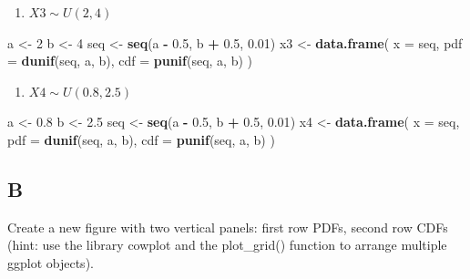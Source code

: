 \documentclass[
]{article}
\newenvironment{Shaded}{\begin{snugshade}}{\end{snugshade}}
\newcommand{\DataTypeTok}[1]{\textcolor[rgb]{0.13,0.29,0.53}{#1}}
\newcommand{\DecValTok}[1]{\textcolor[rgb]{0.00,0.00,0.81}{#1}}
\newcommand{\FloatTok}[1]{\textcolor[rgb]{0.00,0.00,0.81}{#1}}
\newcommand{\KeywordTok}[1]{\textcolor[rgb]{0.13,0.29,0.53}{\textbf{#1}}}
\newcommand{\NormalTok}[1]{#1}
\newcommand{\OperatorTok}[1]{\textcolor[rgb]{0.81,0.36,0.00}{\textbf{#1}}}
\newcommand{\StringTok}[1]{\textcolor[rgb]{0.31,0.60,0.02}{#1}}
\providecommand{\tightlist}{%
  \setlength{\itemsep}{0pt}\setlength{\parskip}{0pt}}
\begin{document}
\begin{enumerate}
\def\labelenumi{\arabic{enumi}.}
\setcounter{enumi}{2}
\tightlist
\item
  \(X3 \sim U(2,4)\)
\end{enumerate}

\begin{Shaded}
\begin{Highlighting}[]
\NormalTok{a \textless{}{-}}\StringTok{ }\DecValTok{2}
\NormalTok{b \textless{}{-}}\StringTok{ }\DecValTok{4}
\NormalTok{seq \textless{}{-}}\StringTok{ }\KeywordTok{seq}\NormalTok{(a }\OperatorTok{{-}}\StringTok{ }\FloatTok{0.5}\NormalTok{, b }\OperatorTok{+}\StringTok{ }\FloatTok{0.5}\NormalTok{, }\FloatTok{0.01}\NormalTok{)}
\NormalTok{x3 \textless{}{-}}\StringTok{ }\KeywordTok{data.frame}\NormalTok{(}
  \DataTypeTok{x =}\NormalTok{ seq,}
  \DataTypeTok{pdf =} \KeywordTok{dunif}\NormalTok{(seq, a, b),}
  \DataTypeTok{cdf =} \KeywordTok{punif}\NormalTok{(seq, a, b)}
\NormalTok{)}
\end{Highlighting}
\end{Shaded}

\begin{enumerate}
\def\labelenumi{\arabic{enumi}.}
\setcounter{enumi}{3}
\tightlist
\item
  \(X4 \sim U(0.8,2.5)\)
\end{enumerate}

\begin{Shaded}
\begin{Highlighting}[]
\NormalTok{a \textless{}{-}}\StringTok{ }\FloatTok{0.8}
\NormalTok{b \textless{}{-}}\StringTok{ }\FloatTok{2.5}
\NormalTok{seq \textless{}{-}}\StringTok{ }\KeywordTok{seq}\NormalTok{(a }\OperatorTok{{-}}\StringTok{ }\FloatTok{0.5}\NormalTok{, b }\OperatorTok{+}\StringTok{ }\FloatTok{0.5}\NormalTok{, }\FloatTok{0.01}\NormalTok{)}
\NormalTok{x4 \textless{}{-}}\StringTok{ }\KeywordTok{data.frame}\NormalTok{(}
  \DataTypeTok{x =}\NormalTok{ seq,}
  \DataTypeTok{pdf =} \KeywordTok{dunif}\NormalTok{(seq, a, b),}
  \DataTypeTok{cdf =} \KeywordTok{punif}\NormalTok{(seq, a, b)}
\NormalTok{)}
\end{Highlighting}
\end{Shaded}

\hypertarget{b}{%
\subsection{B}\label{b}}

Create a new figure with two vertical panels: first row PDFs, second row
CDFs (hint: use the library cowplot and the plot\_grid() function to
arrange multiple ggplot objects).
\end{document}

